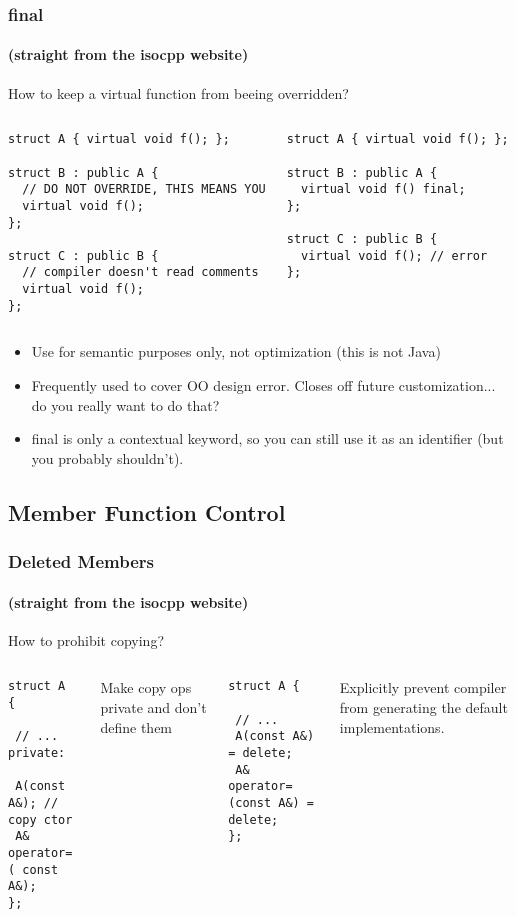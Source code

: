 \begin{frame}[fragile]
\frametitle{final}
\framesubtitle{(straight from the isocpp website)}
How to keep a virtual function from beeing overridden?
\begin{columns}[t]
{\scriptsize
\begin{verbatim}
struct A { virtual void f(); };

struct B : public A {
  // DO NOT OVERRIDE, THIS MEANS YOU
  virtual void f();
};

struct C : public B {
  // compiler doesn't read comments
  virtual void f();
};
\end{verbatim}
}
\pause{}
{\scriptsize
\begin{verbatim}
struct A { virtual void f(); };

struct B : public A {
  virtual void f() final;
};

struct C : public B {
  virtual void f(); // error
};
\end{verbatim}
}
\end{columns}
\pause{}
\begin{itemize}
\item Use for semantic purposes only, not optimization (this is not Java)
\item Frequently used to cover OO design error.  Closes off future
  customization... do you really want to do that?
\item final is only a contextual keyword, so you can still use it as
  an identifier (but you probably shouldn't).
\end{itemize}
\end{frame}



\subsection{Member Function Control}

\begin{frame}[fragile]
\frametitle{Deleted Members}
\framesubtitle{(straight from the isocpp website)}
How to prohibit copying?
\begin{columns}[t]
{\scriptsize

\begin{verbatim}
struct A {

 // ...
private:

 A(const A&); // copy ctor
 A& operator=( const A&);
};
\end{verbatim}

Make copy ops private and don't define them
}
\pause{}
{\scriptsize
\begin{verbatim}
struct A {

 // ...
 A(const A&) = delete;
 A& operator=(const A&) = delete;
};
\end{verbatim}

Explicitly prevent compiler from generating the default implementations.
}
\end{columns}

\end{frame}


